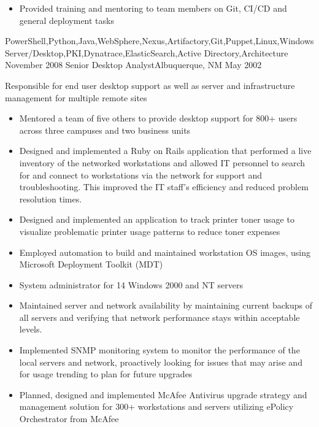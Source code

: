 \begin{experiences}
{\begin{itemize}
                        \item Provided training and mentoring to team members on Git, CI/CD and general deployment tasks
                      \end{itemize}
                    }
                    {PowerShell,Python,Java,WebSphere,Nexus,Artifactory,Git,Puppet,Linux,Windows Server/Desktop,PKI,Dynatrace,ElasticSearch,Active Directory,Architecture}
  \emptySeparator
  \experience
    {November 2008} {Senior Desktop Analyst}{}{Albuquerque, NM}
    {May 2002}    {
                    Responsible for end user desktop support as well as server and infrastructure management for multiple remote sites
                      \begin{itemize}
                        \item Mentored a team of five others to provide desktop support for 800+ users across three campuses and two business units
                        \item Designed and implemented a Ruby on Rails application that performed a live inventory of the networked workstations and allowed IT personnel to search for and connect to workstations via the network for support and troubleshooting. This improved the IT staff’s efficiency and reduced problem resolution times.
                        \item Designed and implemented an application to track printer toner usage to visualize problematic printer usage patterns to reduce toner expenses
                        \item Employed automation to build and maintained workstation OS images, using Microsoft Deployment Toolkit (MDT)
                        \item System administrator for 14 Windows 2000 and NT servers
                        \item Maintained server and network availability by maintaining current backups of all servers and verifying that network performance stays within acceptable levels.
                        \item Implemented SNMP monitoring system to monitor the performance of the local servers and network, proactively looking for issues that may arise and for usage trending to plan for future upgrades
                        \item Planned, designed and implemented McAfee Antivirus upgrade strategy and management solution for 300+ workstations and servers utilizing ePolicy Orchestrator from McAfee

\end{itemize}}
\end{experiences}
